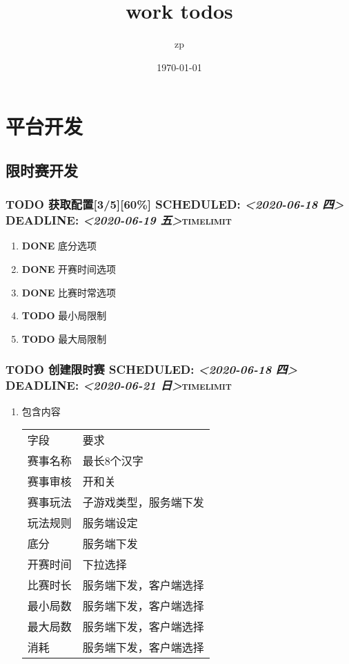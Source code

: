 \documentclass[11pt]{article}
\author{zp}
\date{\today}
\title{work todos}
\begin{document}
\maketitle
\tableofcontents

\section{平台开发}
\label{sec:org60aef1d}
\subsection{限时赛开发}
\label{sec:org1dbce2c}
\subsubsection{{\bfseries\sffamily TODO} 获取配置[3/5][60\%] SCHEDULED: \textit{<2020-06-18 四> } DEADLINE: \textit{<2020-06-19 五>}\hfill{}\textsc{timelimit}}
\label{sec:org3e660b9}
\begin{enumerate}
\item {\bfseries\sffamily DONE} 底分选项
\label{sec:org77d1dc8}
\item {\bfseries\sffamily DONE} 开赛时间选项
\label{sec:org33bd319}
\item {\bfseries\sffamily DONE} 比赛时常选项
\label{sec:org5ed8d17}
\item {\bfseries\sffamily TODO} 最小局限制
\label{sec:org1affc85}
\item {\bfseries\sffamily TODO} 最大局限制
\label{sec:orgdf070ee}
\end{enumerate}
\subsubsection{{\bfseries\sffamily TODO} 创建限时赛 SCHEDULED: \textit{<2020-06-18 四> } DEADLINE: \textit{<2020-06-21 日>}\hfill{}\textsc{timelimit}}
\label{sec:org5c1e595}
\begin{enumerate}
\item 包含内容
\begin{center}
\begin{tabular}{ll}
字段 & 要求\\
赛事名称 & 最长8个汉字\\
赛事审核 & 开和关\\
赛事玩法 & 子游戏类型，服务端下发\\
玩法规则 & 服务端设定\\
底分 & 服务端下发\\
开赛时间 & 下拉选择\\
比赛时长 & 服务端下发，客户端选择\\
最小局数 & 服务端下发，客户端选择\\
最大局数 & 服务端下发，客户端选择\\
消耗 & 服务端下发，客户端选择\\
\end{tabular}
\end{center}
\end{enumerate}
\end{document}
